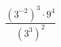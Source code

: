 \begin{ex}[type=calculate]
	\begin{condition}
		\( \dfrac{(3^{-2})^3\cdot9^4}{(3^3)^2} \)
	\end{condition}
\end{ex}